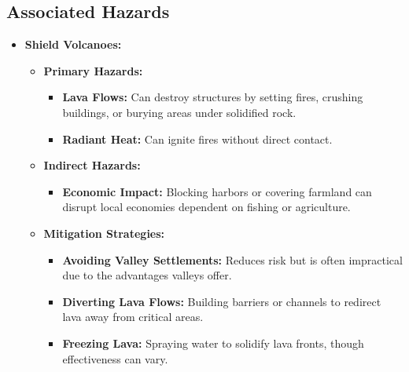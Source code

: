 \documentclass{article}
\begin{document}
\subsection{Associated Hazards}
\begin{itemize}[leftmargin=*, label={--}]
    \item \textbf{Shield Volcanoes:}
    \begin{itemize}[leftmargin=*, label={$\bullet$}]
        \item \textbf{Primary Hazards:}
        \begin{itemize}[leftmargin=*, label={--}]
            \item \textbf{Lava Flows:} Can destroy structures by setting fires, crushing buildings, or burying areas under solidified rock.
            \item \textbf{Radiant Heat:} Can ignite fires without direct contact.
        \end{itemize}
        \item \textbf{Indirect Hazards:}
        \begin{itemize}[leftmargin=*, label={--}]
            \item \textbf{Economic Impact:} Blocking harbors or covering farmland can disrupt local economies dependent on fishing or agriculture.
        \end{itemize}
        \item \textbf{Mitigation Strategies:}
        \begin{itemize}[leftmargin=*, label={--}]
            \item \textbf{Avoiding Valley Settlements:} Reduces risk but is often impractical due to the advantages valleys offer.
            \item \textbf{Diverting Lava Flows:} Building barriers or channels to redirect lava away from critical areas.
            \item \textbf{Freezing Lava:} Spraying water to solidify lava fronts, though effectiveness can vary.
        \end{itemize}
    \end{itemize}
    

\end{itemize}
\end{document}
